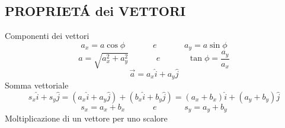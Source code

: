 \documentclass{article}
\newcommand\mathspace{\;\;\;\;\;\;\;\;\;\;\;\; e \;\;\;\;\;\;\;\;\;\;\;\;}
\begin{document}
		\subsection{PROPRIET\'A dei VETTORI}
			Componenti dei vettori
			\begin{equation} a_x = a \cos \phi \mathspace a_y = a \sin \phi \end{equation}
			\begin{equation} a = \sqrt{a_x^2 + a_y^2} \mathspace \tan \phi = \frac{a_y}{a_x} \end{equation}
			\begin{equation} \vec a = a_x \hat{i} + a_y \hat{j} \end{equation}
			Somma vettoriale
			\[ s_x \hat{i} + s_y \hat{j} = ( a_x \hat{i} + a_y \hat{j} ) + ( b_x \hat{i} + b_y \hat{j} ) = ( a_x + b_x ) \hat{i} + ( a_y + b_y ) \hat{j} \]
			\begin{equation} s_x = a_x + b_x \mathspace s_y = a_y + b_y \end{equation}
			Moltiplicazione di un vettore per uno scalore
\end{document}
